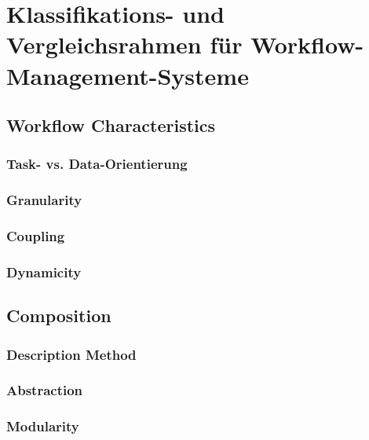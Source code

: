 %

\chapter{Klassifikations- und Vergleichsrahmen für Workflow-Management-Systeme}
\label{sec:classification}

\section{Workflow Characteristics}
\label{sec:classification:workflow-characteristics}

\subsection{Task- vs. Data-Orientierung}
\label{sec:classification:task-vs-data}

\subsection{Granularity}
\label{sec:classification:granularity}

\subsection{Coupling}
\label{sec:classification:coupling}

\subsection{Dynamicity}
\label{sec:classification:dynamicity}

\section{Composition}
\label{sec:classification:composition}

\subsection{Description Method}
\label{sec:classification:description-method}

\subsection{Abstraction}
\label{sec:classification:abstraction}

\subsection{Modularity}
\label{sec:classification:modularity}

